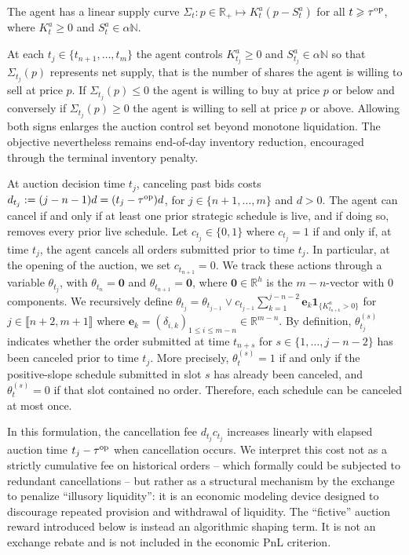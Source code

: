 \documentclass[11pt]{article}
\begin{document}
\begin{assumption}
    The agent has a linear supply curve $\Sigma_t:p\in \mathbb{R}_+ \longmapsto  K_t^a(p-S_t^a)$ for all $t \geqslant  \tau^{\mathrm{op}}$, where $K_t^a\geqslant 0$ and $S_t^a\in \alpha\mathbb N$.
\end{assumption}


At each $t_j\in\{t_{n+1},\dots,t_m\}$ the agent controls $K_{t_j}^a \geqslant  0$ and $S_{t_j}^a\in\alpha\mathbb N$ so that $\Sigma_{t_j}(p)$ represents net supply, that is the number of shares the agent is willing to sell at price $p$. If $\Sigma_{t_j}(p)\leqslant 0$ the agent is willing to buy at price $p$ or below and conversely if $\Sigma_{t_j}(p)\geqslant  0$ the agent is willing to sell at price $p$ or above. Allowing both signs enlarges the auction control set beyond monotone liquidation. The objective nevertheless remains end-of-day inventory reduction, {encouraged through the terminal inventory penalty.}\vspace{0.5em}

{At auction decision time $t_j$, canceling past bids costs $d_{t_j}:=(j-n-1)d=(t_j-\tau^{\mathrm{op}})d$, for $j\in\{n+1,\ldots,m\}$ and $d>0$.} The agent can cancel if and only if at least one prior strategic schedule is live, and if doing so, removes every prior live schedule. Let $c_{t_j} \in \{0,1\}$ where $c_{t_j} = 1$ if and only if, at time $t_j$, the agent cancels all orders submitted prior to time $t_j$. In particular, at the opening of the auction, we set $c_{t_{n+1}} = 0$. We track these actions through a variable $\theta_{t_j}$, with $\theta_{t_n} = \mathbf{0}$ and $\theta_{t_{n+1}} = \mathbf 0$, where $\mathbf 0\in \mathbb{R}^{h}$ is the $m-n$-vector with 0 components. We recursively define $\theta_{t_j} =  \theta_{t_{j-1}}\vee  c_{t_{j-1}}\sum_{k=1}^{j-n-2}\mathbf{e}_{k}\mathbf{1}_{\{K_{t_{n+k}}^a>0\}}$ for $j \in \llbracket n+2,m+1\rrbracket$ where $\mathbf{e}_{k} = (\delta_{i,k})_{1 \leqslant i \leqslant m-n}\in \mathbb{R}^{m-n}$. By definition, $\theta_{t_j}^{(s)}$ indicates whether the order submitted at time $t_{n+s}$ for $s \in \{1,\ldots,j-n-2\}$ has been canceled prior to time $t_j$. More precisely, $\theta_t^{(s)}=1$ if and only if the positive-slope schedule submitted in slot $s$ has already been canceled, and $\theta_t^{(s)}=0$ if that slot contained no order. Therefore, each schedule can be canceled at most once.

\begin{remark}
    In this formulation, the cancellation fee $d_{t_j}c_{t_j}$ increases linearly with elapsed auction time $t_j-\tau^{\mathrm{op}}$ when cancellation occurs. We interpret this cost not as a strictly cumulative fee on historical orders -- which formally could be subjected to redundant cancellations --  but rather as a structural mechanism by the exchange to penalize ``illusory liquidity'': it is an economic modeling device designed to discourage repeated provision and withdrawal of liquidity. The ``fictive'' auction reward introduced below is instead an algorithmic shaping term. It is not an exchange rebate and is not included in the economic PnL criterion. 
\end{remark}
\end{document}
